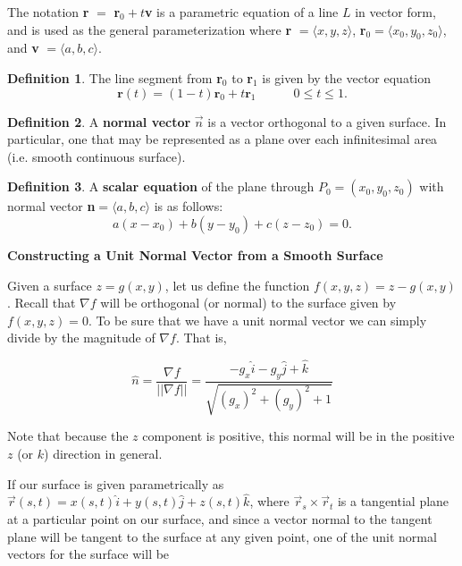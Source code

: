 \documentclass[12pt, a4paper]{article}
\theoremstyle{plain}
\theoremstyle{definition}
\newtheorem{definition}{Definition}[section]
\theoremstyle{remark}
\begin{document}
The notation \textbf{r} $=$ \textbf{r}$_0 +t$\textbf{v} is a parametric equation of a line $L$ in vector form, and is used as the general parameterization where \textbf{r} $ = \langle x, y, z \rangle$, \textbf{r}$_0 = \langle x_0, y_0, z_0 \rangle$, and \textbf{v} $= \langle a, b, c \rangle$.

\begin{definition}
The line segment from \textbf{r}$_0$ to \textbf{r}$_1$ is given by the vector equation 
$$ \textbf{r}(t) = (1-t)\textbf{r}_0+t\textbf{r}_1 \quad \quad \quad 0 \le t \le 1.$$
\end{definition}

\begin{definition}
A \textbf{normal vector} $\vec{n}$ is a vector orthogonal to a given surface. In particular, one that may be represented as a plane over each infinitesimal area (i.e. smooth continuous surface).
\end{definition}

\begin{definition}
A \textbf{scalar equation} of the plane through $P_0 = (x_0, y_0, z_0)$ with normal vector \textbf{n}$ = \langle a, b, c \rangle$ is as follows:
$$ a(x-x_0) + b(y-y_0) + c(z-z_0) = 0.$$
\end{definition}

\vspace{.05in}

\textbf{Constructing a Unit Normal Vector from a Smooth Surface}

Given a surface $z=g(x,y)$, let us define the function $f(x,y,z) = z-g(x,y)$. Recall that $\nabla f$ will be orthogonal (or normal) to the surface given by $f(x,y,z)=0$. To be sure that we have a unit normal vector we can simply divide by the magnitude of $\nabla f$. That is, 

$$ \hat{n} = \frac{\nabla f}{|| \nabla f ||} = \frac{-g_x \hat{i} -g_y \hat{j} + \hat{k}}{\sqrt{(g_x)^2+(g_y)^2+1}}$$

Note that because the $z$ component is positive, this normal will be in the positive $z$ (or $k$) direction in general.

If our surface is given parametrically as $\vec{r}(s,t) = x(s,t) \hat{i} + y(s,t) \hat{j} + z(s,t) \hat{k}$, where $\vec{r}_s \times \vec{r}_t$ is a tangential plane at a particular point on our surface, and since a vector normal to the tangent plane will be tangent to the surface at any given point, one of the unit normal vectors for the surface will be 
\end{document}
